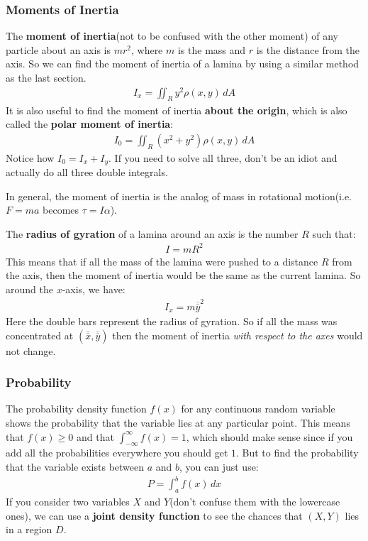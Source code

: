 \documentclass{article}
\let\oldhat\hat
\renewcommand{\hat}[1]{\oldhat{\mathbf{#1}}}
\let\bb\hat
\renewcommand{\bb}[1]{\overline{\overline{#1}}}
\begin{document}
\subsubsection{Moments of Inertia}
The \textbf{moment of inertia}(not to be confused with the other moment) of any particle about an axis is $mr^2$, where $m$ is the mass and $r$ is the distance from the axis. So we can find the moment of inertia of a lamina by using a similar method as the last section.
\begin{gather*}
    I_x = \iint_R y^2 \rho(x,y) \,dA
\end{gather*}
It is also useful to find the moment of inertia \textbf{about the origin}, which is also called the \textbf{polar moment of inertia}:
\begin{gather*}
    I_0 = \iint_R (x^2+y^2) \rho(x,y) \, dA
\end{gather*}
Notice how $I_0 = I_x + I_y$. If you need to solve all three, don't be an idiot and actually do all three double integrals.

In general, the moment of inertia is the analog of mass in rotational motion(i.e. $F = ma$ becomes $\tau = I \alpha$).

The \textbf{radius of gyration} of a lamina around an axis is the number $R$ such that:
\begin{gather*}
    I = mR^2
\end{gather*}
This means that if all the mass of the lamina were pushed to a distance $R$ from the axis, then the moment of inertia would be the same as the current lamina. So around the $x$-axis, we have:
\begin{gather*}
    I_x = m\bb{y}^2
\end{gather*}
Here the double bars represent the radius of gyration. So if all the mass was concentrated at $(\bb{x},\bb{y})$ then the moment of inertia \textit{with respect to the axes} would not change.
\subsubsection{Probability}
The probability density function $f(x)$ for any continuous random variable shows the probability that the variable lies at any particular point. This means that $f(x) \geqslant 0$ and that $\int_{-\infty}^\infty f(x) = 1$, which should make sense since if you add all the probabilities everywhere you should get $1$. But to find the probability that the variable exists between $a$ and $b$, you can just use:
\begin{gather*}
    P = \int_a^b f(x) \, dx
\end{gather*}
If you consider two variables $X$ and $Y$(don't confuse them with the lowercase ones), we can use a \textbf{joint density function} to see the chances that $(X,Y)$ lies in a region $D$.
\end{document}
